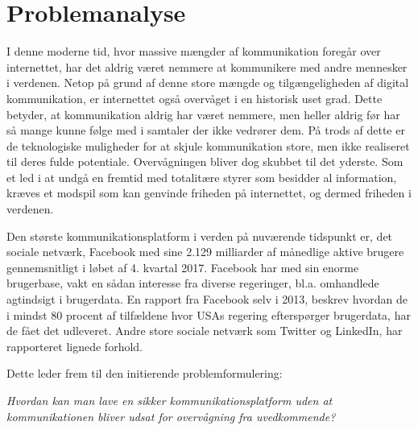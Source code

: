 \section{Problemanalyse}
I denne moderne tid, hvor massive mængder af kommunikation foregår over internettet, har det aldrig været nemmere at kommunikere med andre mennesker i verdenen. Netop på grund af denne store mængde og tilgængeligheden af digital kommunikation, er internettet også overvåget i en historisk uset grad. Dette betyder, at kommunikation aldrig har været nemmere, men heller aldrig før har så mange kunne følge med i samtaler der ikke vedrører dem.\cite{Adgang_PersonligeData} På trods af dette er de teknologiske muligheder for at skjule kommunikation store, men ikke realiseret til deres fulde potentiale. Overvågningen bliver dog skubbet til det yderste. Som et led i at undgå en fremtid med totalitære styrer som besidder al information, kræves et modspil som kan genvinde friheden på internettet, og dermed friheden i verdenen. 

Den største kommunikationsplatform i verden på nuværende tidspunkt er, det sociale netværk, Facebook med sine 2.129 milliarder af månedlige aktive brugere gennemsnitligt i løbet af 4. kvartal 2017.\cite{FacebookStat} Facebook har med sin enorme brugerbase, vakt en sådan interesse fra diverse regeringer, bl.a. omhandlede agtindsigt i brugerdata. En rapport fra Facebook selv i 2013, beskrev hvordan de i mindst 80 procent af tilfældene hvor USAs regering efterspørger brugerdata, har de fået det udleveret.\cite{PolitikenFacebook} Andre store sociale netværk som Twitter og LinkedIn, har rapporteret lignede forhold.\cite{PolitikenFacebook}

Dette leder frem til den initierende problemformulering:
\begin{mdframed}[linewidth=0pt,backgroundcolor=lightgray!20,innertopmargin = 0.4cm,innerbottommargin = 0.4cm]
    \textit{Hvordan kan man lave en sikker kommunikationsplatform uden at kommunikationen bliver udsat for overvågning fra uvedkommende?}
\end{mdframed}

\newpage

\newpage

\newpage


\newpage